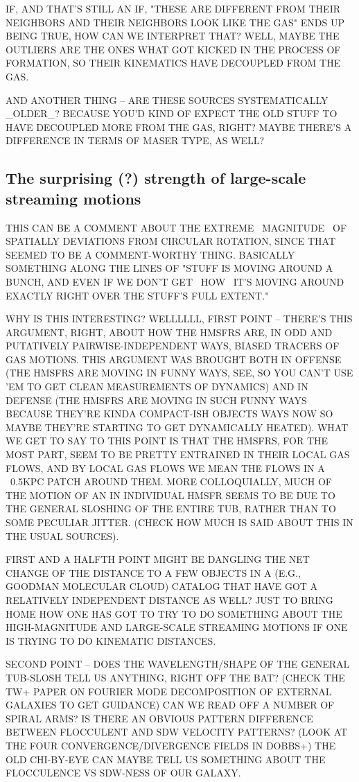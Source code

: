 IF, AND THAT'S STILL AN IF, "THESE ARE DIFFERENT FROM THEIR NEIGHBORS AND THEIR NEIGHBORS LOOK LIKE THE GAS" ENDS UP BEING TRUE, HOW CAN WE INTERPRET THAT? WELL, MAYBE THE OUTLIERS ARE THE ONES WHAT GOT KICKED IN THE PROCESS OF FORMATION, SO THEIR KINEMATICS HAVE DECOUPLED FROM THE GAS.

AND ANOTHER THING -- ARE THESE SOURCES SYSTEMATICALLY _OLDER_? BECAUSE YOU'D KIND OF EXPECT THE OLD STUFF TO HAVE DECOUPLED MORE FROM THE GAS, RIGHT? MAYBE THERE'S A DIFFERENCE IN TERMS OF MASER TYPE, AS WELL?

\subsection{The surprising (?) strength of large-scale streaming motions}
THIS CAN BE A COMMENT ABOUT THE EXTREME ~MAGNITUDE~ OF SPATIALLY DEVIATIONS FROM CIRCULAR ROTATION, SINCE THAT SEEMED TO BE A COMMENT-WORTHY THING.
BASICALLY SOMETHING ALONG THE LINES OF "STUFF IS MOVING AROUND A BUNCH, AND EVEN IF WE DON'T GET ~HOW~ IT'S MOVING AROUND EXACTLY RIGHT OVER THE STUFF'S FULL EXTENT."

WHY IS THIS INTERESTING? WELLLLLL, FIRST POINT -- THERE'S THIS ARGUMENT, RIGHT, ABOUT HOW THE HMSFRS ARE, IN ODD AND PUTATIVELY PAIRWISE-INDEPENDENT WAYS, BIASED TRACERS OF GAS MOTIONS. 
THIS ARGUMENT WAS BROUGHT BOTH IN OFFENSE (THE HMSFRS ARE MOVING IN FUNNY WAYS, SEE, SO YOU CAN'T USE 'EM TO GET CLEAN MEASUREMENTS OF DYNAMICS) AND IN DEFENSE (THE HMSFRS ARE MOVING IN SUCH FUNNY WAYS BECAUSE THEY'RE KINDA COMPACT-ISH OBJECTS WAYS NOW SO MAYBE THEY'RE STARTING TO GET DYNAMICALLY HEATED). 
WHAT WE GET TO SAY TO THIS POINT IS THAT THE HMSFRS, FOR THE MOST PART, SEEM TO BE PRETTY ENTRAINED IN THEIR LOCAL GAS FLOWS, AND BY LOCAL GAS FLOWS WE MEAN THE FLOWS IN A ~0.5KPC PATCH AROUND THEM.
MORE COLLOQUIALLY, MUCH OF THE MOTION OF AN IN INDIVIDUAL HMSFR SEEMS TO BE DUE TO THE GENERAL SLOSHING OF THE ENTIRE TUB, RATHER THAN TO SOME PECULIAR JITTER. (CHECK HOW MUCH IS SAID ABOUT THIS IN THE USUAL SOURCES).

FIRST AND A HALFTH POINT MIGHT BE DANGLING THE NET CHANGE OF THE DISTANCE TO A FEW OBJECTS IN A (E.G., GOODMAN MOLECULAR CLOUD) CATALOG THAT HAVE GOT A RELATIVELY INDEPENDENT DISTANCE AS WELL? JUST TO BRING HOME HOW ONE HAS GOT TO TRY TO DO SOMETHING ABOUT THE HIGH-MAGNITUDE AND LARGE-SCALE STREAMING MOTIONS IF ONE IS TRYING TO DO KINEMATIC DISTANCES. 

SECOND POINT -- DOES THE WAVELENGTH/SHAPE OF THE GENERAL TUB-SLOSH TELL US ANYTHING, RIGHT OFF THE BAT? (CHECK THE TW+ PAPER ON FOURIER MODE DECOMPOSITION OF EXTERNAL GALAXIES TO GET GUIDANCE)
CAN WE READ OFF A NUMBER OF SPIRAL ARMS? IS THERE AN OBVIOUS PATTERN DIFFERENCE BETWEEN FLOCCULENT AND SDW VELOCITY PATTERNS? (LOOK AT THE FOUR CONVERGENCE/DIVERGENCE FIELDS IN DOBBS+)
THE OLD CHI-BY-EYE CAN MAYBE TELL US SOMETHING ABOUT THE FLOCCULENCE VS SDW-NESS OF OUR GALAXY.


